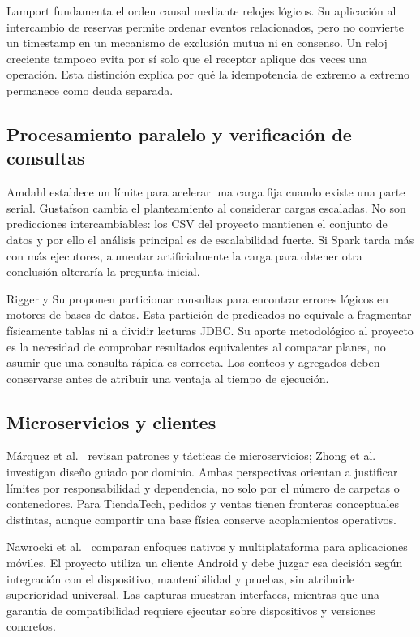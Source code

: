 \documentclass[12pt,a4paper]{article}
\begin{document}
Lamport \cite{lamport1978} fundamenta el orden causal mediante relojes lógicos. Su aplicación al intercambio de reservas permite ordenar eventos relacionados, pero no convierte un timestamp en un mecanismo de exclusión mutua ni en consenso. Un reloj creciente tampoco evita por sí solo que el receptor aplique dos veces una operación. Esta distinción explica por qué la idempotencia de extremo a extremo permanece como deuda separada.



\subsection{Procesamiento paralelo y verificación de consultas}
Amdahl \cite{amdahl1967validity} establece un límite para acelerar una carga fija cuando existe una parte serial. Gustafson \cite{gustafson1988reevaluating} cambia el planteamiento al considerar cargas escaladas. No son predicciones intercambiables: los CSV del proyecto mantienen el conjunto de datos y por ello el análisis principal es de escalabilidad fuerte. Si Spark tarda más con más ejecutores, aumentar artificialmente la carga para obtener otra conclusión alteraría la pregunta inicial.

Rigger y Su \cite{rigger2020querypartitioning} proponen particionar consultas para encontrar errores lógicos en motores de bases de datos. Esta partición de predicados no equivale a fragmentar físicamente tablas ni a dividir lecturas JDBC. Su aporte metodológico al proyecto es la necesidad de comprobar resultados equivalentes al comparar planes, no asumir que una consulta rápida es correcta. Los conteos y agregados deben conservarse antes de atribuir una ventaja al tiempo de ejecución.

\subsection{Microservicios y clientes}
Márquez et al.\ \cite{marquez2018review} revisan patrones y tácticas de microservicios; Zhong et al.\ \cite{zhong2024domaindriven} investigan diseño guiado por dominio. Ambas perspectivas orientan a justificar límites por responsabilidad y dependencia, no solo por el número de carpetas o contenedores. Para TiendaTech, pedidos y ventas tienen fronteras conceptuales distintas, aunque compartir una base física conserve acoplamientos operativos.

Nawrocki et al.\ \cite{nawrocki2021comparison} comparan enfoques nativos y multiplataforma para aplicaciones móviles. El proyecto utiliza un cliente Android y debe juzgar esa decisión según integración con el dispositivo, mantenibilidad y pruebas, sin atribuirle superioridad universal. Las capturas muestran interfaces, mientras que una garantía de compatibilidad requiere ejecutar sobre dispositivos y versiones concretos.
\end{document}
